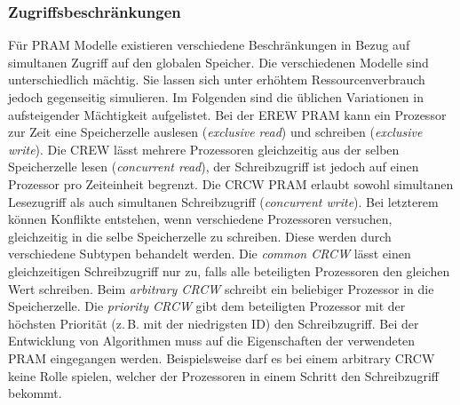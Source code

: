 \subsubsection{Zugriffsbeschränkungen}
Für PRAM Modelle existieren verschiedene Beschränkungen in Bezug auf simultanen
Zugriff auf den globalen Speicher.
Die verschiedenen Modelle sind unterschiedlich mächtig. Sie lassen sich unter
erhöhtem Ressourcenverbrauch jedoch gegenseitig simulieren.
Im Folgenden sind die üblichen Variationen in aufsteigender Mächtigkeit
aufgelistet.
Bei der EREW PRAM kann ein Prozessor zur Zeit eine Speicherzelle auslesen
(\emph{exclusive read}) und schreiben (\emph{exclusive write}).
Die CREW lässt mehrere Prozessoren gleichzeitig aus der selben Speicherzelle
lesen (\emph{concurrent read}), der Schreibzugriff ist jedoch auf einen
Prozessor pro Zeiteinheit begrenzt.
Die CRCW PRAM erlaubt sowohl simultanen Lesezugriff als auch simultanen
Schreibzugriff (\emph{concurrent write}).
Bei letzterem können Konflikte entstehen, wenn verschiedene Prozessoren
versuchen, gleichzeitig in die selbe Speicherzelle zu schreiben.
Diese werden durch verschiedene Subtypen behandelt werden.
Die \emph{common CRCW} lässt einen gleichzeitigen Schreibzugriff nur zu, falls
alle beteiligten Prozessoren den gleichen Wert schreiben.
Beim \emph{arbitrary CRCW} schreibt ein beliebiger Prozessor in die
Speicherzelle.
Die \emph{priority CRCW} gibt dem beteiligten Prozessor mit der höchsten
Priorität (z.\,B. mit der niedrigsten ID) den Schreibzugriff.
Bei der Entwicklung von Algorithmen muss auf die Eigenschaften der verwendeten
PRAM eingegangen werden.
Beispielsweise darf es bei einem arbitrary CRCW keine Rolle spielen, welcher der
Prozessoren in einem Schritt den Schreibzugriff bekommt.
\cite[S.14f.]{jaja}
